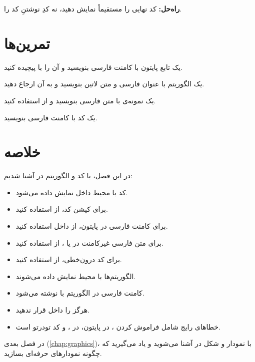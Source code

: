 \textbf{راه‌حل:} کد نهایی را مستقیماً نمایش دهید،
نه کدِ نوشتنِ کد را.

\section{تمرین‌ها}
\label{sec:code-exercises}

\begin{exercise}
    یک تابع پایتون با کامنت فارسی بنویسید
    و آن را با  پیچیده کنید.
    \label{exc:code-python}
\end{exercise}

\begin{exercise}
    یک الگوریتم با عنوان فارسی و متن لاتین
    بنویسید و به آن ارجاع دهید.
    \label{exc:code-algorithm}
\end{exercise}

\begin{exercise}
    یک نمونه‌ی  با متن فارسی بنویسید
    و از  استفاده کنید.
    \label{exc:code-latex}
\end{exercise}

\begin{exercise}
    یک کد  با کامنت فارسی بنویسید.
    \label{exc:code-cpp}
\end{exercise}

\section{خلاصه}
\label{sec:code-summary}

در این فصل، با کد و الگوریتم در 
آشنا شدیم:

\begin{itemize}
    \item کد با محیط  داخل
     نمایش داده می‌شود.

    \item برای کپشن کد، از 
    استفاده کنید.

    \item برای کامنت فارسی در پایتون، از
     داخل  استفاده کنید.

    \item برای متن فارسی غیرکامنت در
     یا ، از  استفاده
    کنید.

    \item برای کد درون‌خطی، از 
    استفاده کنید.

    \item الگوریتم‌ها با محیط 
    نمایش داده می‌شوند.

    \item کامنت فارسی در الگوریتم با
     نوشته
    می‌شود.

    \item هرگز  را داخل 
    قرار ندهید.

    \item خطاهای رایج شامل فراموش کردن
    ،  در پایتون، 
    در ، و کد تودرتو است.
\end{itemize}

در فصل بعدی (\cref{chap:graphics})، با نمودار
و شکل در  آشنا می‌شوید و
یاد می‌گیرید که چگونه نمودارهای حرفه‌ای
بسازید.